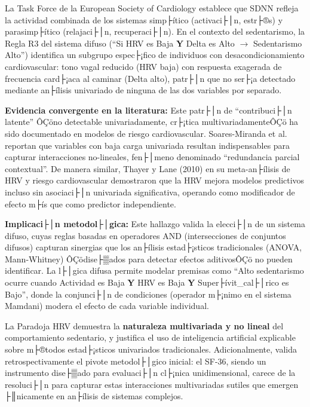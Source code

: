 La Task Force de la European Society of Cardiology \cite{TaskForce1996} establece que SDNN refleja la actividad combinada de los sistemas simp├ítico (activaci├│n, estr├®s) y parasimp├ítico (relajaci├│n, recuperaci├│n). En el contexto del sedentarismo, la Regla R3 del sistema difuso (``Si HRV es Baja \textbf{Y} Delta es Alto $\rightarrow$ Sedentarismo Alto'') identifica un subgrupo espec├¡fico de individuos con desacondicionamiento cardiovascular: tono vagal reducido (HRV baja) con respuesta exagerada de frecuencia card├¡aca al caminar (Delta alto), patr├│n que no ser├¡a detectado mediante an├ílisis univariado de ninguna de las dos variables por separado.

\textbf{Evidencia convergente en la literatura:} Este patr├│n de ``contribuci├│n latente'' ÔÇöno detectable univariadamente, cr├¡tica multivariadamenteÔÇö ha sido documentado en modelos de riesgo cardiovascular. Soares-Miranda et al. \cite{Soares-Miranda2014} reportan que variables con baja carga univariada resultan indispensables para capturar interacciones no-lineales, fen├│meno denominado ``redundancia parcial contextual''. De manera similar, Thayer y Lane (2010) en su meta-an├ílisis de HRV y riesgo cardiovascular demostraron que la HRV mejora modelos predictivos incluso sin asociaci├│n univariada significativa, operando como modificador de efecto m├ís que como predictor independiente.

\textbf{Implicaci├│n metodol├│gica:} Este hallazgo valida la elecci├│n de un sistema difuso, cuyas reglas basadas en operadores AND (intersecciones de conjuntos difusos) capturan sinergias que los an├ílisis estad├¡sticos tradicionales (ANOVA, Mann-Whitney) ÔÇödise├▒ados para detectar efectos aditivosÔÇö no pueden identificar. La l├│gica difusa permite modelar premisas como ``Alto sedentarismo ocurre cuando Actividad es Baja \textbf{Y} HRV es Baja \textbf{Y} Super├ívit\_cal├│rico es Bajo'', donde la conjunci├│n de condiciones (operador m├¡nimo en el sistema Mamdani) modera el efecto de cada variable individual.

La Paradoja HRV demuestra la \textbf{naturaleza multivariada y no lineal} del comportamiento sedentario, y justifica el uso de inteligencia artificial explicable sobre m├®todos estad├¡sticos univariados tradicionales. Adicionalmente, valida retrospectivamente el pivote metodol├│gico inicial: el SF-36, siendo un instrumento dise├▒ado para evaluaci├│n cl├¡nica unidimensional, carece de la resoluci├│n para capturar estas interacciones multivariadas sutiles que emergen ├║nicamente en an├ílisis de sistemas complejos.

